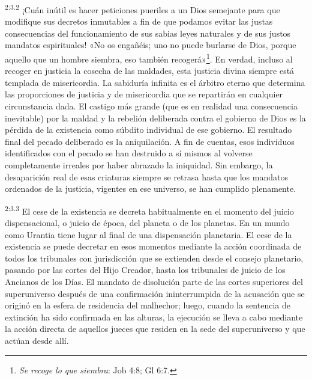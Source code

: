 \par
\textsuperscript{2:3.2} ¡Cuán inútil es hacer peticiones pueriles a un Dios semejante para que modifique sus decretos inmutables a fin de que podamos evitar las justas consecuencias del funcionamiento de sus sabias leyes naturales y de sus justos mandatos espirituales! «No os engañéis; uno no puede burlarse de Dios, porque aquello que un hombre siembra, eso también recogerá»\footnote{\textit{Se recoge lo que siembra}: Job 4:8; Gl 6:7.}. En verdad, incluso al recoger en justicia la cosecha de las maldades, esta justicia divina siempre está templada de misericordia. La sabiduría infinita es el árbitro eterno que determina las proporciones de justicia y de misericordia que se repartirán en cualquier circunstancia dada. El castigo más grande (que es en realidad una consecuencia inevitable) por la maldad y la rebelión deliberada contra el gobierno de Dios es la pérdida de la existencia como súbdito individual de ese gobierno. El resultado final del pecado deliberado es la aniquilación. A fin de cuentas, esos individuos identificados con el pecado se han destruido a sí mismos al volverse completamente irreales por haber abrazado la iniquidad. Sin embargo, la desaparición real de esas criaturas siempre se retrasa hasta que los mandatos ordenados de la justicia, vigentes en ese universo, se han cumplido plenamente.

\par
\textsuperscript{2:3.3} El cese de la existencia se decreta habitualmente en el momento del juicio dispensacional, o juicio de época, del planeta o de los planetas. En un mundo como Urantia tiene lugar al final de una dispensación planetaria. El cese de la existencia se puede decretar en esos momentos mediante la acción coordinada de todos los tribunales con jurisdicción que se extienden desde el consejo planetario, pasando por las cortes del Hijo Creador, hasta los tribunales de juicio de los Ancianos de los Días. El mandato de disolución parte de las cortes superiores del superuniverso después de una confirmación ininterrumpida de la acusación que se originó en la esfera de residencia del malhechor; luego, cuando la sentencia de extinción ha sido confirmada en las alturas, la ejecución se lleva a cabo mediante la acción directa de aquellos jueces que residen en la sede del superuniverso y que actúan desde allí.

